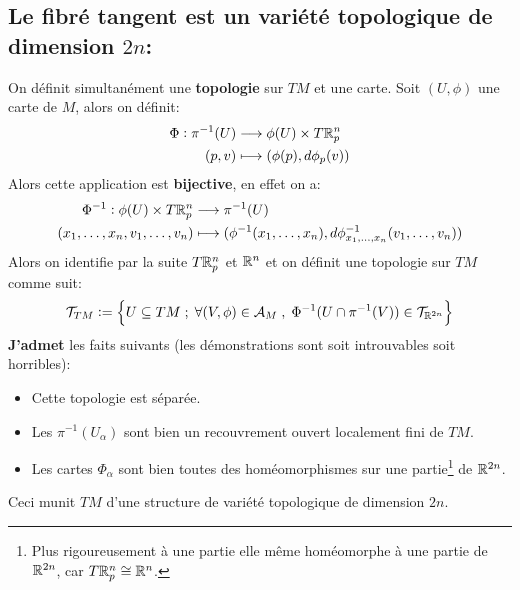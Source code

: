    \subsection*{Le fibré tangent est un variété topologique de dimension \( 2n \){:}}
      On définit simultanément une \textbf{topologie} sur \( TM \) et une carte. Soit \( (U, \phi) \) une carte de \( M \), alors on définit:
      \[ 
         \begin{aligned}
            \Phi : \pi^{-1}(U) &\longrightarrow \phi(U) \times T\mathbb{R}^n_p \\
            (p, v) &\longmapsto (\phi(p), d\phi_{p}(v))
         \end{aligned}         
      \]
      Alors cette application est \textbf{bijective}, en effet on a:
      \[ 
         \begin{aligned}
            \Phi^{-1} : \phi(U) \times T\mathbb{R}^n_p &\longrightarrow \pi^{-1}(U) \\
            (x_1, \ldots, x_n, v_1, \ldots, v_n) &\longmapsto (\phi^{-1}(x_1, \ldots, x_n), d\phi^{-1}_{x_1, \ldots, x_n}(v_1, \ldots, v_n))
         \end{aligned}         
      \]
      Alors on identifie par la suite \( T\mathbb{R}^n_p \) et \( \mathbb{R}^n \) et on définit une topologie sur \( TM \) comme suit:
      \[ 
         \mathcal{T}_{TM} := \left\{ U \subseteq TM \; ; \; \forall (V, \phi) \in \mathcal{A}_M \; , \; \Phi^{-1}(U \cap \pi^{-1}(V)) \in \mathcal{T}_{ \mathbb{R}^{2n}} \right\}  
      \]
      \textbf{\color{red} J'admet } les faits suivants (les démonstrations sont soit introuvables soit horribles):
      \begin{itemize}
         \item Cette topologie est séparée.
         \item Les \( \pi^{-1}(U_\alpha) \) sont bien un recouvrement ouvert localement fini de \( TM \).
         \item Les cartes \( \Phi_{\alpha} \) sont bien toutes des homéomorphismes sur une partie\footnote[1]{Plus rigoureusement à une partie elle même homéomorphe à une partie de \(\mathbb{R}^{2n}\), car \( T \mathbb{R}^n_p \cong \mathbb{R}^n \).} de \(\mathbb{R}^{2n}\).
      \end{itemize}
      Ceci munit \( TM \) d'une structure de variété topologique de dimension \( 2n \).
